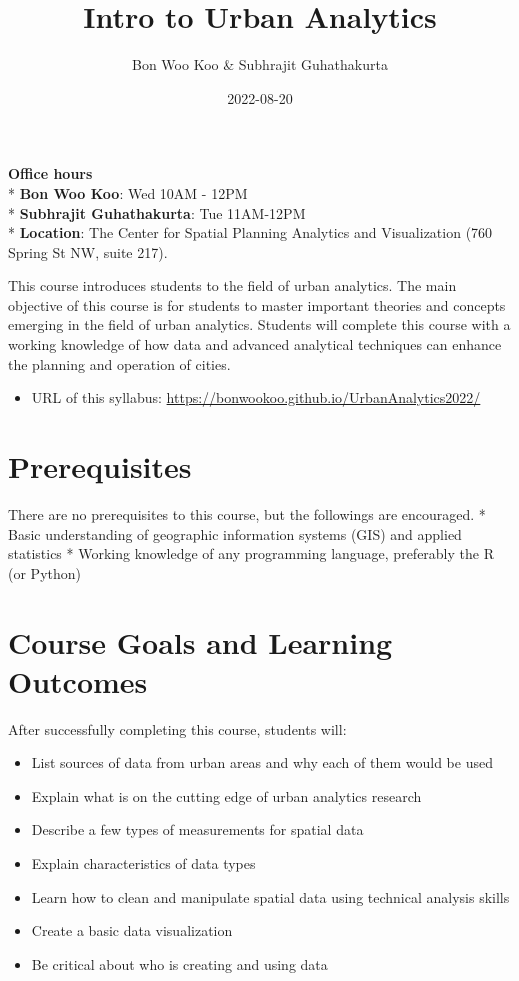 \documentclass[
]{article}
\title{Intro to Urban Analytics}
\author{Bon Woo Koo \& Subhrajit Guhathakurta}
\date{2022-08-20}
\providecommand{\tightlist}{%
  \setlength{\itemsep}{0pt}\setlength{\parskip}{0pt}}
\begin{document}
\maketitle

\textbf{Office hours}\\
* \textbf{Bon Woo Koo}: Wed 10AM - 12PM\\
* \textbf{Subhrajit Guhathakurta}: Tue 11AM-12PM\\
* \textbf{Location}: The Center for Spatial Planning Analytics and
Visualization (760 Spring St NW, suite 217).

This course introduces students to the field of urban analytics. The
main objective of this course is for students to master important
theories and concepts emerging in the field of urban analytics. Students
will complete this course with a working knowledge of how data and
advanced analytical techniques can enhance the planning and operation of
cities.

\begin{itemize}
\tightlist
\item
  URL of this syllabus:
  \url{https://bonwookoo.github.io/UrbanAnalytics2022/}
\end{itemize}

\hypertarget{prerequisites}{%
\section{Prerequisites}\label{prerequisites}}

There are no prerequisites to this course, but the followings are
encouraged. * Basic understanding of geographic information systems
(GIS) and applied statistics * Working knowledge of any programming
language, preferably the R (or Python)

\hypertarget{course-goals-and-learning-outcomes}{%
\section{Course Goals and Learning
Outcomes}\label{course-goals-and-learning-outcomes}}

After successfully completing this course, students will:

\begin{itemize}
\tightlist
\item
  List sources of data from urban areas and why each of them would be
  used
\item
  Explain what is on the cutting edge of urban analytics research
\item
  Describe a few types of measurements for spatial data
\item
  Explain characteristics of data types
\item
  Learn how to clean and manipulate spatial data using technical
  analysis skills
\item
  Create a basic data visualization
\item
  Be critical about who is creating and using data
\end{itemize}
\end{document}
